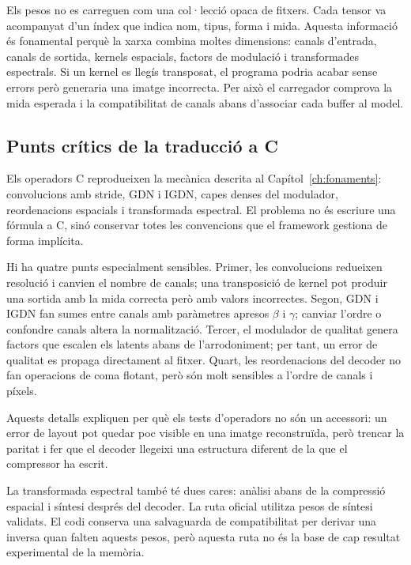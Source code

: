 Els pesos no es carreguen com una col·lecció opaca de fitxers. Cada tensor va
acompanyat d'un índex que indica nom, tipus, forma i mida. Aquesta informació
és fonamental perquè la xarxa combina moltes dimensions: canals d'entrada,
canals de sortida, kernels espacials, factors de modulació i transformades
espectrals. Si un kernel es llegís transposat, el programa podria acabar sense
errors però generaria una imatge incorrecta. Per això el carregador comprova la
mida esperada i la compatibilitat de canals abans d'associar cada buffer al
model.

\subsection{Punts crítics de la traducció a C}\label{sec:operadors}

Els operadors C reprodueixen la mecànica descrita al
Capítol~\ref{ch:fonaments}: convolucions amb stride, GDN i IGDN, capes denses
del modulador, reordenacions espacials i transformada espectral. El problema no
és escriure una fórmula a C, sinó conservar totes les convencions que el
framework gestiona de forma implícita.

Hi ha quatre punts especialment sensibles. Primer, les convolucions redueixen
resolució i canvien el nombre de canals; una transposició de kernel pot produir
una sortida amb la mida correcta però amb valors incorrectes. Segon, GDN i IGDN
fan sumes entre canals amb paràmetres apresos $\beta$ i $\gamma$; canviar
l'ordre o confondre canals altera la normalització. Tercer, el modulador de
qualitat genera factors que escalen els latents abans de l'arrodoniment; per
tant, un error de qualitat es propaga directament al fitxer. Quart, les
reordenacions del decoder no fan operacions de coma flotant, però són molt
sensibles a l'ordre de canals i píxels.

Aquests detalls expliquen per què els tests d'operadors no són un accessori:
un error de layout pot quedar poc visible en una imatge reconstruïda, però
trencar la paritat i fer que el decoder llegeixi una estructura diferent de la
que el compressor ha escrit.

La transformada espectral també té dues cares: anàlisi abans de la compressió
espacial i síntesi després del decoder. La ruta oficial utilitza pesos de
síntesi validats. El codi conserva una salvaguarda de compatibilitat per
derivar una inversa quan falten aquests pesos, però aquesta ruta no és la base
de cap resultat experimental de la memòria.

